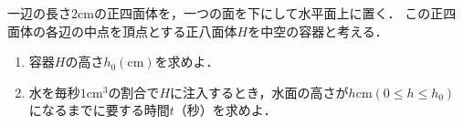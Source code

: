 一辺の長さ$2\mathrm{cm}$の正四面体を，一つの面を下にして水平面上に置く．
この正四面体の各辺の中点を頂点とする正八面体$H$を中空の容器と考える．
\begin{enumerate}
  \item 容器$H$の高さ$h_0(\mathrm{cm})$を求めよ．
  \item 水を毎秒$1\mathrm{cm}^3$の割合で$H$に注入するとき，水面の高さが$h \mathrm{cm} (0\le h\le h_0)$になるまでに要する時間$t$（秒）を求めよ．
\end{enumerate}